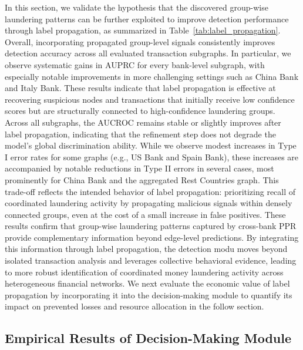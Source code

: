 In this section, we validate the hypothesis that the discovered group-wise laundering patterns can be further exploited to improve detection performance through label propagation, as summarized in Table~\ref{tab:label_propagation}. Overall, incorporating propagated group-level signals consistently improves detection accuracy across all evaluated transaction subgraphs. In particular, we observe systematic gains in AUPRC for every bank-level subgraph, with especially notable improvements in more challenging settings such as China Bank and Italy Bank. These results indicate that label propagation is effective at recovering suspicious nodes and transactions that initially receive low confidence scores but are structurally connected to high-confidence laundering groups. Across all subgraphs, the AUCROC remains stable or slightly improves after label propagation, indicating that the refinement step does not degrade the model’s global discrimination ability. While we observe modest increases in Type I error rates for some graphs (e.g., US Bank and Spain Bank), these increases are accompanied by notable reductions in Type II errors in several cases, most prominently for China Bank and the aggregated Rest Countries graph. This trade-off reflects the intended behavior of label propagation: prioritizing recall of coordinated laundering activity by propagating malicious signals within densely connected groups, even at the cost of a small increase in false positives. These results confirm that group-wise laundering patterns captured by cross-bank PPR provide complementary information beyond edge-level predictions. By integrating this information through label propagation, the detection modu moves beyond isolated transaction analysis and leverages collective behavioral evidence, leading to more robust identification of coordinated money laundering activity across heterogeneous financial networks. We next evaluate the economic value of label propagation by incorporating it into the decision-making module to quantify its impact on prevented losses and resource allocation in the follow section.




\subsection{Empirical Results of Decision-Making Module}

